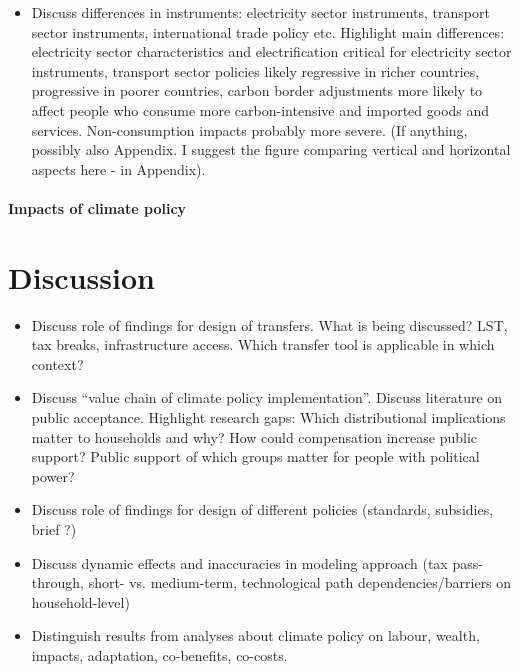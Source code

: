 \documentclass[12pt, a4paper]{article}
\begin{document}
\begin{itemize}
  \item Discuss differences in instruments: electricity sector instruments, transport sector instruments, international trade policy etc. Highlight main differences: electricity sector characteristics and electrification critical for electricity sector instruments, transport sector policies likely regressive in richer countries, progressive in poorer countries, carbon border adjustments more likely to affect people who consume more carbon-intensive and imported goods and services. Non-consumption impacts probably more severe. (If anything, possibly also Appendix. I suggest the figure comparing vertical and horizontal aspects here - in Appendix).
\end{itemize}

\paragraph{Impacts of climate policy}

\section{Discussion} \label{sec:discussion}

\begin{itemize}
  \item Discuss role of findings for design of transfers. What is being discussed? LST, tax breaks, infrastructure access. Which transfer tool is applicable in which context?
\item Discuss ``value chain of climate policy implementation''. Discuss literature on public acceptance. Highlight research gaps: Which distributional implications matter to households and why? How could compensation increase public support? Public support of which groups matter for people with political power?
 \item Discuss role of findings for design of different policies (standards, subsidies, brief ?)
 \item Discuss dynamic effects and inaccuracies in modeling approach (tax pass-through, short- vs. medium-term, technological path dependencies/barriers on household-level)
 \item Distinguish results from analyses about climate policy on labour, wealth, impacts, adaptation, co-benefits, co-costs.
\end{itemize}
\end{document}
